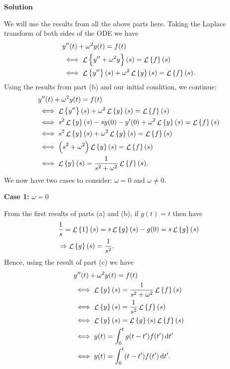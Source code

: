\documentclass{article}
\DeclareMathOperator{\Lagr}{\mathcal{L}}
\begin{document}
\textbf{Solution}

We will use the results from all the above parts here. Taking the
Laplace transform of both sides of the ODE we have
%
\begin{align*}
    &y^{\prime \prime}(t) + \omega^2 y(t) = f(t) \\
    &\iff \Lagr \cbr{y^{\prime \prime} + \omega^2 y}(s) = \Lagr \cbr{f}(s) \\
    &\iff \Lagr \cbr{y^{\prime \prime}}(s) + \omega^2 \Lagr \cbr{y}(s) = \Lagr \cbr{f}(s)
    .
\end{align*}
%
Using the results from part (b) and our initial condition, we continue:
%
\begin{align*}
    &y^{\prime \prime}(t) + \omega^2 y(t) = f(t) \\
    &\iff \Lagr \cbr{y^{\prime \prime}}(s) + \omega^2 \Lagr \cbr{y}(s) = \Lagr \cbr{f}(s) \\
    &\iff s^2 \Lagr \cbr{y}(s) - s y(0) - y^\prime(0) + \omega^2 \Lagr \cbr{y}(s) = \Lagr \cbr{f}(s) \\
    &\iff s^2 \Lagr \cbr{y}(s) + \omega^2 \Lagr \cbr{y}(s) = \Lagr \cbr{f}(s) \\
    &\iff \del{s^2 + \omega^2} \Lagr \cbr{y}(s) = \Lagr \cbr{f}(s) \\
    &\iff \Lagr \cbr{y}(s) = \frac{1}{s^2 + \omega^2} \Lagr \cbr{f}(s)
    .
\end{align*}
%
We now have two cases to consider: $\omega = 0$ and $\omega \neq 0$.

\textbf{Case 1:} $\omega = 0$

From the first results of parts (a) and (b), if $g(t) = t$ then
have
%
\begin{align*}
    &\frac{1}{s} = \Lagr \cbr{1}(s) = s \Lagr \cbr{g}(s) - g(0) = s \Lagr \cbr{g}(s) \\
    &\Rightarrow \Lagr \cbr{g}(s) = \frac{1}{s^2}
    .
\end{align*}
%
Hence, using the result of part (c) we have
%
\begin{align*}
    &y^{\prime \prime}(t) + \omega^2 y(t) = f(t) \\
    &\iff \Lagr \cbr{y}(s) = \frac{1}{s^2 + \omega^2} \Lagr \cbr{f}(s) \\
    &\iff \Lagr \cbr{y}(s) = \frac{1}{s^2} \Lagr \cbr{f}(s) \\
    &\iff \Lagr \cbr{y}(s) = \Lagr \cbr{g}(s) \Lagr \cbr{f}(s) \\
    &\iff y(t) = \int_0^t g(t - t^\prime) f(t^\prime) \dif t^\prime \\
    &\iff y(t) = \int_0^t (t - t^\prime) f(t^\prime) \dif t^\prime
    .
\end{align*}
\end{document}
